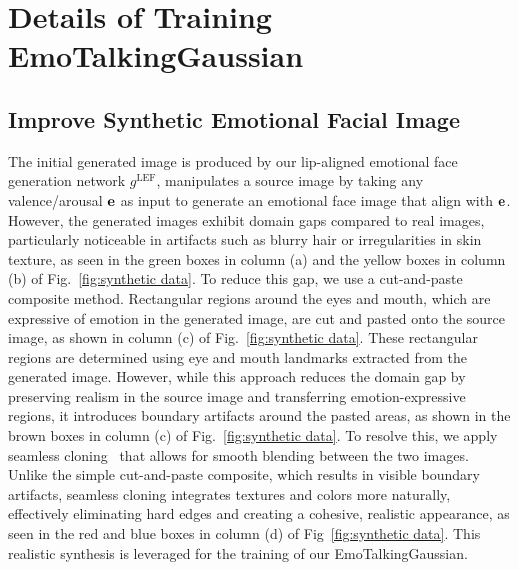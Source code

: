 \section{Details of Training EmoTalkingGaussian}
\subsection{Improve Synthetic Emotional Facial Image}
\label{sec:seamless cloning}
The initial generated image is produced by our lip-aligned emotional face generation network $g^\text{LEF}$, manipulates a source image by taking any valence/arousal $\mathbf{e}$ as input to generate an emotional face image that align with $\mathbf{e}$. However, the generated images exhibit domain gaps compared to real images, particularly noticeable in artifacts such as blurry hair or irregularities in skin texture, as seen in the green boxes in column (a) and the yellow boxes in column (b) of Fig.~\ref{fig:synthetic data}. To reduce this gap, we use a cut-and-paste composite method. Rectangular regions around the eyes and mouth, which are expressive of emotion in the generated image, are cut and pasted onto the source image, as shown in column (c) of Fig.~\ref{fig:synthetic data}. These rectangular regions are determined using eye and mouth landmarks extracted from the generated image. However, while this approach reduces the domain gap by preserving realism in the source image and transferring emotion-expressive regions, it introduces boundary artifacts around the pasted areas, as shown in the brown boxes in column (c) of Fig.~\ref{fig:synthetic data}. To resolve this, we apply seamless cloning~\cite{perez2023poisson} that allows for smooth blending between the two images. Unlike the simple cut-and-paste composite, which results in visible boundary artifacts, seamless cloning integrates textures and colors more naturally, effectively eliminating hard edges and creating a cohesive, realistic appearance, as seen in the red and blue boxes in column (d) of Fig~\ref{fig:synthetic data}. This realistic synthesis is leveraged for the training of our EmoTalkingGaussian.

